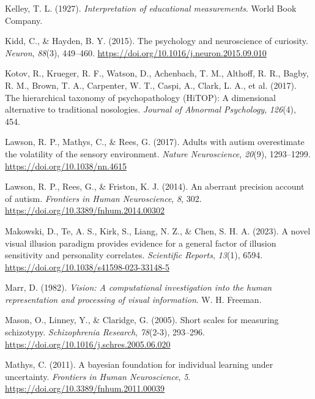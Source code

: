 \documentclass[
  jou,
  floatsintext,
  longtable,
  nolmodern,
  notxfonts,
  notimes,
  12pt,
  colorlinks=true,linkcolor=blue,citecolor=blue,urlcolor=blue]{apa7}
\newlength{\cslhangindent}
\newenvironment{CSLReferences}[2] %
 {\begin{list}{}{%
  \setlength{\itemindent}{0pt}
  \setlength{\leftmargin}{0pt}
  \setlength{\parsep}{0pt}
  \ifodd #1
   \setlength{\leftmargin}{\cslhangindent}
   \setlength{\itemindent}{-1\cslhangindent}
  \fi
  \setlength{\itemsep}{#2\baselineskip}}}
 {\end{list}}
\begin{document}
\begin{CSLReferences}{1}{0}
Kelley, T. L. (1927). \emph{Interpretation of educational measurements}.
World Book Company.

Kidd, C., \& Hayden, B. Y. (2015). The psychology and neuroscience of
curiosity. \emph{Neuron}, \emph{88}(3), 449--460.
\url{https://doi.org/10.1016/j.neuron.2015.09.010}

{Kotov, R., Krueger, R. F., Watson, D., Achenbach, T. M., Althoff, R.
R., Bagby, R. M., Brown, T. A., Carpenter, W. T., Caspi, A., Clark, L.
A., et al.} (2017). The hierarchical taxonomy of psychopathology
(HiTOP): A dimensional alternative to traditional nosologies.
\emph{Journal of Abnormal Psychology}, \emph{126}(4), 454.

Lawson, R. P., Mathys, C., \& Rees, G. (2017). Adults with autism
overestimate the volatility of the sensory environment. \emph{Nature
Neuroscience}, \emph{20}(9), 1293--1299.
\url{https://doi.org/10.1038/nn.4615}

Lawson, R. P., Rees, G., \& Friston, K. J. (2014). An aberrant precision
account of autism. \emph{Frontiers in Human Neuroscience}, \emph{8},
302. \url{https://doi.org/10.3389/fnhum.2014.00302}

Makowski, D., Te, A. S., Kirk, S., Liang, N. Z., \& Chen, S. H. A.
(2023). A novel visual illusion paradigm provides evidence for a general
factor of illusion sensitivity and personality correlates.
\emph{Scientific Reports}, \emph{13}(1), 6594.
\url{https://doi.org/10.1038/s41598-023-33148-5}

Marr, D. (1982). \emph{Vision: A computational investigation into the
human representation and processing of visual information}. W. H.
Freeman.

Mason, O., Linney, Y., \& Claridge, G. (2005). Short scales for
measuring schizotypy. \emph{Schizophrenia Research}, \emph{78}(2-3),
293--296. \url{https://doi.org/10.1016/j.schres.2005.06.020}

Mathys, C. (2011). A bayesian foundation for individual learning under
uncertainty. \emph{Frontiers in Human Neuroscience}, \emph{5}.
\url{https://doi.org/10.3389/fnhum.2011.00039}


\end{CSLReferences}
\end{document}
